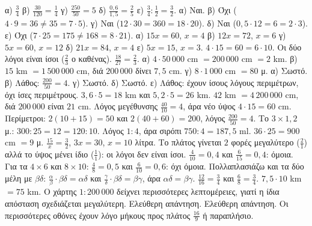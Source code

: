 α) $\frac{3}{4}$ \quad β) $\frac{30}{120}=\frac{1}{4}$ \quad γ) $\frac{250}{50}=5$ \quad δ) $\frac{0{,}6}{1{,}5}=\frac{2}{5}$ \quad ε) $\frac{3}{4}:\frac{1}{2}=\frac{3}{2}$.
 α) Ναι. β) Όχι ($4\cdot9=36\neq35=7\cdot5$). γ) Ναι ($12\cdot30=360=18\cdot20$). δ) Ναι ($0{,}5\cdot12=6=2\cdot3$). ε) Όχι ($7\cdot25=175\neq168=8\cdot21$).
 α) $15x=60$, $x=4$ \quad β) $12x=72$, $x=6$ \quad γ) $5x=60$, $x=12$ \quad δ) $21x=84$, $x=4$ \quad ε) $5x=15$, $x=3$.
 $4\cdot15=60=6\cdot10$. Οι δύο λόγοι είναι ίσοι ($\frac{2}{3}$ ο καθένας).
 $\frac{18}{27}=\frac{2}{3}$.
 α) $4\cdot50\,000$ cm $=200\,000$ cm $=2$ km. β) $15$ km $=1\,500\,000$ cm, διά $200\,000$ δίνει $7{,}5$ cm. γ) $8\cdot1\,000$ cm $=80$ μ.
 α) Σωστό. β) Λάθος: $\frac{200}{50}=4$. γ) Σωστό. δ) Σωστό. ε) Λάθος: έχουν ίσους λόγους περιμέτρων, όχι ίσες περιμέτρους.
 $3{,}6\cdot5=18$ km και $5{,}2\cdot5=26$ km.
 $42$ km $=4\,200\,000$ cm, διά $200\,000$ είναι $21$ cm.
 Λόγος μεγέθυνσης $\frac{40}{10}=4$, άρα νέο ύψος $4\cdot15=60$ cm. Περίμετροι: $2(10+15)=50$ και $2(40+60)=200$, λόγος $\frac{200}{50}=4$.
 Το $3\times1{,}2$ μ.: $300:25=12=120:10$.
 Λόγος $1:4$, άρα σιρόπι $750:4=187{,}5$ ml.
 $36\cdot25=900$ cm $=9$ μ.
 $\frac{15}{x}=\frac{3}{2}$, $3x=30$, $x=10$ λίτρα.
 Το πλάτος γίνεται $2$ φορές μεγαλύτερο ($\frac{2}{1}$) αλλά το ύψος μένει ίδιο ($\frac{1}{1}$): οι λόγοι δεν είναι ίσοι.
 $\frac{4}{10}=0{,}4$ και $\frac{6}{15}=0{,}4$: όμοια. Για τα $4\times6$ και $8\times10$: $\frac{4}{8}=0{,}5$ και $\frac{6}{10}=0{,}6$: όχι όμοια.
 Πολλαπλασιάζω και τα δύο μέλη με $\beta\delta$: $\frac{\alpha}{\beta}\cdot\beta\delta=\alpha\delta$ και $\frac{\gamma}{\delta}\cdot\beta\delta=\beta\gamma$, άρα $\alpha\delta=\beta\gamma$.
 $\frac{12}{16}=\frac{3}{4}$ και $\frac{6}{8}=\frac{3}{4}$.
 $7{,}5\cdot10$ km $=75$ km. Ο χάρτης $1:200\,000$ δείχνει περισσότερες λεπτομέρειες, γιατί η ίδια απόσταση σχεδιάζεται μεγαλύτερη.
 Ελεύθερη απάντηση.
 Ελεύθερη απάντηση. Οι περισσότερες οθόνες έχουν λόγο μήκους προς πλάτος $\frac{16}{9}$ ή παραπλήσιο.
